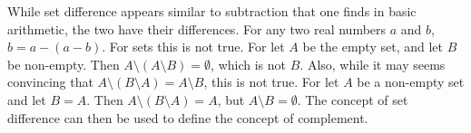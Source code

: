         While set difference appears similar to subtraction that one finds in
        basic arithmetic, the two have their differences. For any two real
        numbers $a$ and $b$, $b=a-(a-b)$. For sets this is not true. For let $A$
        be the empty set, and let $B$ be non-empty. Then
        $A\setminus(A\setminus{B})=\emptyset$, which is not $B$.
        Also, while it may seems convincing that
        $A\setminus(B\setminus{A})=A\setminus{B}$, this is not true. For
        let $A$ be a non-empty set and let $B=A$. Then
        $A\setminus(B\setminus{A})=A$, but $A\setminus{B}=\emptyset$.
        The concept of set difference can then be used to define the
        concept of complement.

